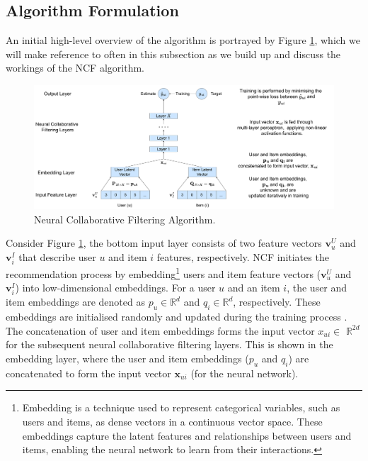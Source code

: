 \subsection{Algorithm Formulation}
\label{subsec:4 Algorithm Formulation for NCF}

 An initial high-level overview of the algorithm is portrayed by Figure \ref{fig:NCF algorithm}, which we will make reference to often in this subsection as we build up and discuss the workings of the NCF algorithm.

\begin{figure}[h]
  \centering
  \includegraphics[width=0.9999\textwidth]{Figures/flowchart of model process-NCF-5.pdf} %
  \caption{Neural Collaborative Filtering Algorithm.}
  \label{fig:NCF algorithm}
\end{figure}

Consider Figure \ref{fig:NCF algorithm}, the bottom input layer consists of two feature vectors $\mathbf{v}_u^U$ and $\mathbf{v}_i^I$ that describe user $u$ and item $i$ features, respectively. NCF initiates the recommendation process by embedding\footnote{Embedding is a technique used to represent categorical variables, such as users and items, as dense vectors in a continuous vector space. These embeddings capture the latent features and relationships between users and items, enabling the neural network to learn from their interactions.} users and item feature vectors ($\mathbf{v}_u^U$ and $\mathbf{v}_i^I$) into low-dimensional embeddings. For a user $u$ and an item $i$, the user and item embeddings are denoted as $p_u \in \mathbb{R}^d$ and $q_i \in \mathbb{R}^d$, respectively. These embeddings are initialised randomly and updated during the training process \cite{he2017neural}. The concatenation of user and item embeddings forms the input vector $x_{u i} \in$ $\mathbb{R}^{2 d} $ for the subsequent neural collaborative filtering layers. This is shown in the embedding layer, where the user and item embeddings ($p_u$ and $q_i$) are concatenated to form the input vector $\mathbf{x}_{ui}$ (for the neural network).

